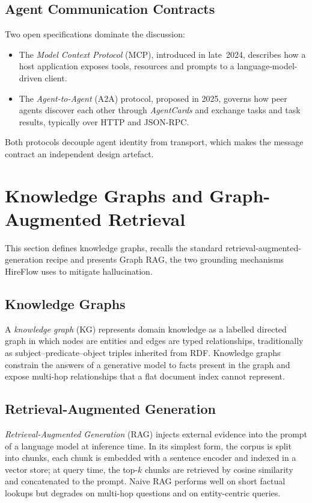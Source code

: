 \subsection{Agent Communication Contracts}
Two open specifications dominate the discussion:
\begin{itemize}
    \item The \emph{Model Context Protocol} (\acs{MCP}), introduced
        in late~2024, describes how a host application exposes tools,
        resources and prompts to a language-model-driven client.
    \item The \emph{Agent-to-Agent} (\acs{A2A}) protocol, proposed in
        2025, governs how peer agents discover each other through
        \emph{AgentCards} and exchange tasks and task results,
        typically over HTTP and JSON-RPC.
\end{itemize}
\noindent Both protocols decouple agent identity from transport, which
makes the message contract an independent design artefact.

\section{Knowledge Graphs and Graph-Augmented Retrieval}

This section defines knowledge graphs, recalls the standard
retrieval-augmented-generation recipe and presents Graph RAG, the two
grounding mechanisms HireFlow uses to mitigate hallucination.

\subsection{Knowledge Graphs}
A \emph{knowledge graph} (\acs{KG}) represents domain knowledge as a
labelled directed graph in which nodes are entities and edges are typed
relationships, traditionally as subject--predicate--object triples
inherited from \acs{RDF}. Knowledge graphs constrain the answers of a
generative model to facts present in the graph and expose multi-hop
relationships that a flat document index cannot represent.

\subsection{Retrieval-Augmented Generation}
\emph{Retrieval-Augmented Generation} (\acs{RAG}) injects external
evidence into the prompt of a language model at inference time. In its simplest
form, the corpus is split into chunks, each chunk is embedded with a
sentence encoder and indexed in a vector store; at query time, the
top-$k$ chunks are retrieved by cosine similarity and concatenated to
the prompt. Naive RAG performs well on short factual lookups but
degrades on multi-hop questions and on entity-centric queries.

